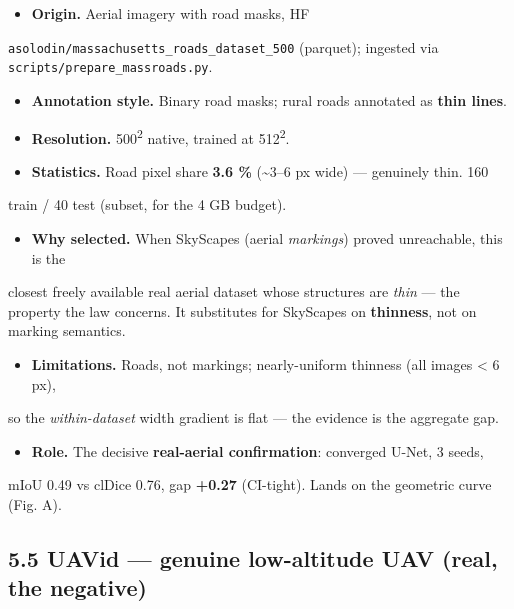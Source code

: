 \documentclass[11pt]{article}
\begin{document}
\begin{itemize}\setlength{\itemsep}{1pt}
\item \textbf{Origin.} Aerial imagery with road masks, HF
\end{itemize}
  \texttt{asolodin/massachusetts\_roads\_dataset\_500} (parquet); ingested via   \texttt{scripts/prepare\_massroads.py}.
\begin{itemize}\setlength{\itemsep}{1pt}
\item \textbf{Annotation style.} Binary road masks; rural roads annotated as \textbf{thin lines}.
\item \textbf{Resolution.} 500\textsuperscript{2} native, trained at 512\textsuperscript{2}.
\item \textbf{Statistics.} Road pixel share \textbf{3.6 \%} (\textasciitilde{}3--6 px wide) --- genuinely thin. 160
\end{itemize}
  train / 40 test (subset, for the 4 GB budget).
\begin{itemize}\setlength{\itemsep}{1pt}
\item \textbf{Why selected.} When SkyScapes (aerial \textit{markings}) proved unreachable, this is the
\end{itemize}
  closest freely available real aerial dataset whose structures are \textit{thin} --- the   property the law concerns. It substitutes for SkyScapes on \textbf{thinness}, not on   marking semantics.
\begin{itemize}\setlength{\itemsep}{1pt}
\item \textbf{Limitations.} Roads, not markings; nearly-uniform thinness (all images < 6 px),
\end{itemize}
  so the \textit{within-dataset} width gradient is flat --- the evidence is the aggregate gap.
\begin{itemize}\setlength{\itemsep}{1pt}
\item \textbf{Role.} The decisive \textbf{real-aerial confirmation}: converged U-Net, 3 seeds,
\end{itemize}
  mIoU 0.49 vs clDice 0.76, gap \textbf{+0.27} (CI-tight). Lands on the geometric curve   (Fig. A).

\subsection*{5.5 UAVid --- genuine low-altitude UAV (real, the negative)}
\end{document}

